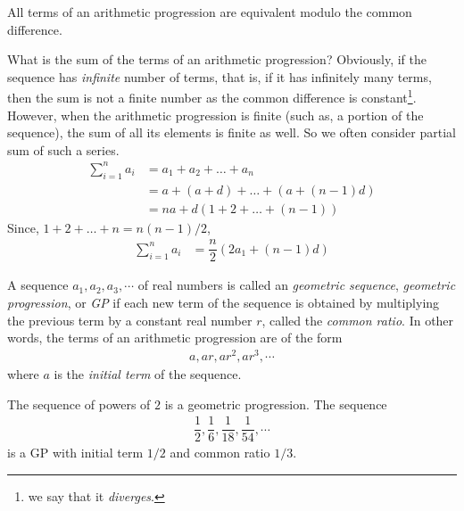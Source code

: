 \begin{corollary}
	All terms of an arithmetic progression are equivalent modulo the common difference.
\end{corollary}
What is the sum of the terms of an arithmetic progression? Obviously, if the sequence has \textit{infinite} number of terms, that is, if it has infinitely many terms, then the sum is not a finite number as the common difference is constant\footnote{we say that it \textit{diverges}.}. However, when the arithmetic progression is finite (such as, a portion of the sequence), the sum of all its elements is finite as well. So we often consider partial sum of such a series.
		\begin{align*}
			\sum_{i=1}^{n} a_i
				&= a_1 + a_2 + \ldots + a_n \\
				&= a + (a+d) + \ldots + \left(a+ (n-1)d\right)\\
				&= na + d\left(1+2+\ldots+ (n-1)\right)
		\end{align*}
	Since, $1+2+\ldots+n = n(n-1)/2$,
		\begin{align*}
			\sum_{i=1}^{n} a_i
				& = \dfrac{n}{2} \left(2a_1 + (n-1)d\right)
		\end{align*}

\begin{definition}
	A sequence $a_1, a_2, a_3, \cdots$ of real numbers is called an \textit{geometric sequence}, \textit{geometric progression}, or \textit{GP} if each new term of the sequence is obtained by multiplying the previous term by a constant real number $r$, called the \textit{common ratio}. In other words, the terms of an arithmetic progression are of the form
		\begin{align*}
			a, ar, ar^2, ar^3, \cdots
		\end{align*}
	where $a$ is the \textit{initial term} of the sequence.
\end{definition}

\begin{example}
	The sequence of powers of $2$ is a geometric progression. The sequence
		\begin{align*}
			\dfrac{1}{2}, \dfrac{1}{6}, \dfrac{1}{18}, \dfrac{1}{54}, \cdots
		\end{align*}
	is a GP with initial term $1/2$ and common ratio $1/3$.
\end{example}

